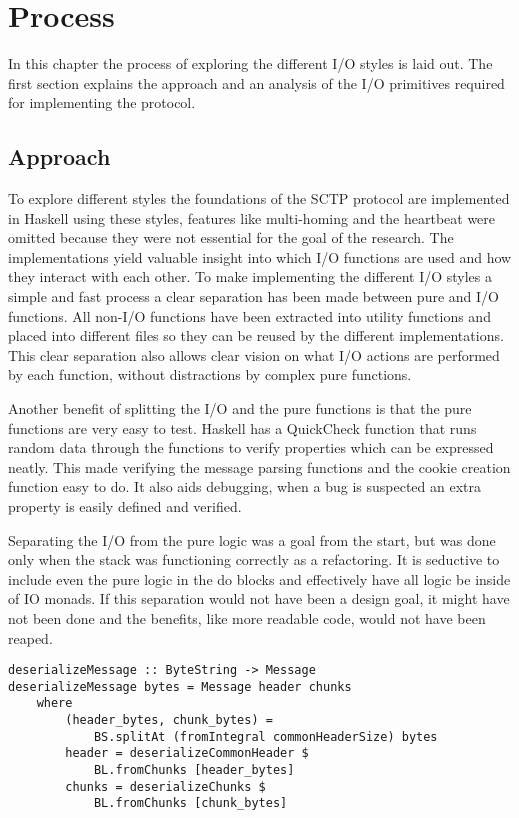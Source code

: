 \chapter{Process}
In this chapter the process of exploring the different I/O styles is laid out. The first section explains the approach and an analysis of the I/O primitives required for implementing the protocol.

\section{Approach}
To explore different styles the foundations of the SCTP protocol\cite{_rfc_????} are implemented in Haskell using these styles, features like multi-homing and the heartbeat were omitted because they were not essential for the goal of the research. The implementations yield valuable insight into which I/O functions are used and how they interact with each other.
To make implementing the different I/O styles a simple and fast process a clear separation has been made between pure and I/O functions. All non-I/O functions have been extracted into utility functions and placed into different files so they can be reused by the different implementations. This clear separation also allows clear vision on what I/O actions are performed by each function, without distractions by complex pure functions.

Another benefit of splitting the I/O and the pure functions is that the pure functions are very easy to test. Haskell has a QuickCheck\cite{Claessen_2000} function that runs random data through the functions to verify properties which can be expressed neatly. This made verifying the message parsing functions and the cookie creation function easy to do. It also aids debugging, when a bug is suspected an extra property is easily defined and verified.

Separating the I/O from the pure logic was a goal from the start, but was done only when the stack was functioning correctly as a refactoring. It is seductive to include even the pure logic in the do blocks and effectively have all logic be inside of IO monads. If this separation would not have been a design goal, it might have not been done and the benefits, like more readable code, would not have been reaped.

\begin{lstlisting}[caption={An example of a shared pure function}, label={lst:shared}]
deserializeMessage :: ByteString -> Message
deserializeMessage bytes = Message header chunks
    where
        (header_bytes, chunk_bytes) =
            BS.splitAt (fromIntegral commonHeaderSize) bytes
        header = deserializeCommonHeader $
            BL.fromChunks [header_bytes]
        chunks = deserializeChunks $
            BL.fromChunks [chunk_bytes]
\end{lstlisting}

